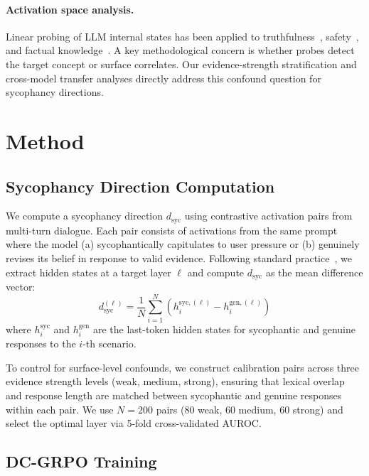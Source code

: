 \documentclass[11pt,a4paper]{article}
\begin{document}
\paragraph{Activation space analysis.}
Linear probing of LLM internal states has been applied to truthfulness~\citep{marks2023geometry}, safety~\citep{craft2024}, and factual knowledge~\citep{knowledgegap2024}. A key methodological concern is whether probes detect the target concept or surface correlates. Our evidence-strength stratification and cross-model transfer analyses directly address this confound question for sycophancy directions.

\section{Method}

\subsection{Sycophancy Direction Computation}

We compute a sycophancy direction $d_{\mathrm{syc}}$ using contrastive activation pairs from multi-turn dialogue. Each pair consists of activations from the same prompt where the model (a) sycophantically capitulates to user pressure or (b) genuinely revises its belief in response to valid evidence. Following standard practice~\citep{sycnotone2024}, we extract hidden states at a target layer $\ell$ and compute $d_{\mathrm{syc}}$ as the mean difference vector:
\begin{equation}
    d_{\mathrm{syc}}^{(\ell)} = \frac{1}{N}\sum_{i=1}^{N}\left(h_i^{\mathrm{syc},(\ell)} - h_i^{\mathrm{gen},(\ell)}\right)
\end{equation}
where $h_i^{\mathrm{syc}}$ and $h_i^{\mathrm{gen}}$ are the last-token hidden states for sycophantic and genuine responses to the $i$-th scenario.

To control for surface-level confounds, we construct calibration pairs across three evidence strength levels (weak, medium, strong), ensuring that lexical overlap and response length are matched between sycophantic and genuine responses within each pair. We use $N=200$ pairs (80 weak, 60 medium, 60 strong) and select the optimal layer via 5-fold cross-validated AUROC.

\subsection{DC-GRPO Training}
\end{document}

